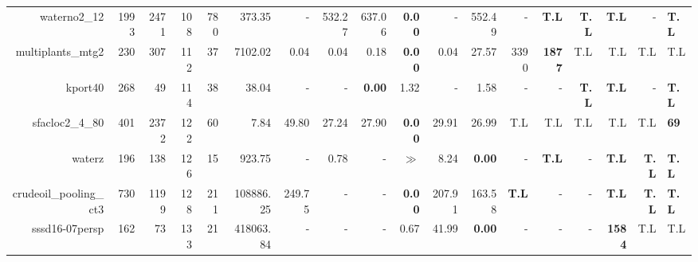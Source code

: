 \begin{table*}[t]
\begin{tabular}{|r|r|r|r|r||r||r|r|r|r|r||r|r|r|r|r|r|}
                      waterno2\_12 &         1993 &          2471 &          108 &           780 &              373.35 &              - &         532.27 &         637.06 &  \textbf{0.00} &              - &         552.49 &                  - &       \textbf{T.L} &       \textbf{T.L} &       \textbf{T.L} &            - & \textbf{T.L} \\ 
                 multiplants\_mtg2 &          230 &           307 &          112 &            37 &             7102.02 &           0.04 &           0.04 &           0.18 &  \textbf{0.00} &           0.04 &          27.57 &               3390 &      \textbf{1877} &                T.L &                T.L &          T.L &          T.L \\ 
                           kport40 &          268 &            49 &          114 &            38 &               38.04 &              - &              - &  \textbf{0.00} &           1.32 &              - &           1.58 &                  - &                  - &       \textbf{T.L} &       \textbf{T.L} &            - & \textbf{T.L} \\ 
                   sfacloc2\_4\_80 &          401 &          2372 &          122 &            60 &                7.84 &          49.80 &          27.24 &          27.90 &  \textbf{0.00} &          29.91 &          26.99 &                T.L &                T.L &                T.L &                T.L &          T.L &  \textbf{69} \\ 
                            waterz &          196 &           138 &          126 &            15 &              923.75 &              - &           0.78 &              - &          $\gg$ &           8.24 &  \textbf{0.00} &                  - &       \textbf{T.L} &                  - &       \textbf{T.L} & \textbf{T.L} & \textbf{T.L} \\ 
            crudeoil\_pooling\_ct3 &          730 &          1199 &          128 &           211 &           108886.25 &         249.75 &              - &              - &  \textbf{0.00} &         207.91 &         163.58 &       \textbf{T.L} &                  - &                  - &       \textbf{T.L} & \textbf{T.L} & \textbf{T.L} \\ 
                    sssd16-07persp &          162 &            73 &          133 &            21 &           418063.84 &              - &              - &              - &           0.67 &          41.99 &  \textbf{0.00} &                  - &                  - &                  - &      \textbf{1584} &          T.L &          T.L \\ 

\end{tabular}
\end{table*}
